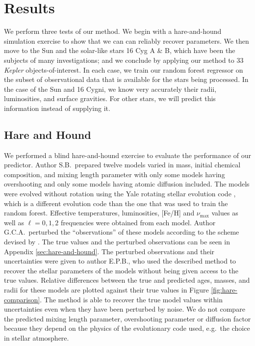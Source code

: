 \documentclass[twocolumn,twocolappendix]{aastex6}
\begin{document}


\section{Results}
We perform three tests of our method. We begin with a hare-and-hound simulation exercise to show that we can can reliably recover parameters. We then move to the Sun and the solar-like stars 16 Cyg A \& B, which have been the subjects of many investigations; and we conclude by applying our method to 33 \emph{Kepler} objects-of-interest. In each case, we train our random forest regressor on the subset of observational data that is available for the stars being processed. In the case of the Sun and 16 Cygni, we know very accurately their radii, luminosities, and surface gravities. For other stars, we will predict this information instead of supplying it. 


\subsection{Hare and Hound} 
We performed a blind hare-and-hound exercise to evaluate the performance of our predictor. Author S.B.\ prepared twelve models varied in mass, initial chemical composition, and mixing length parameter with only some models having overshooting and only some models having atomic diffusion included. The models were evolved without rotation using the Yale rotating stellar evolution code \citep[YREC;][]{2008Ap&SS.316...31D}, which is a different evolution code than the one that was used to train the random forest. Effective temperatures, luminosities, [Fe/H] and $\nu_{\max}$ values as well as $\ell=0,1,2$ frequencies were obtained from each model. Author G.C.A.\  perturbed the ``observations'' of these models according to the scheme devised by \citet{spaceinn}. The true values and the perturbed observations can be seen in Appendix \ref{sec:hare-and-hound}. The perturbed observations and their uncertainties were given to author E.P.B.\@, who used the described method to recover the stellar parameters of the models without being given access to the true values. Relative differences between the true and predicted ages, masses, and radii for these models are plotted against their true values in Figure \ref{fig:hare-comparison}. The method is able to recover the true model values within uncertainties even when they have been perturbed by noise. We do not compare the predicted mixing length parameter, overshooting parameter or diffusion factor because they depend on the physics of the evolutionary code used, e.g.\ the choice in stellar atmosphere. 
\end{document}
